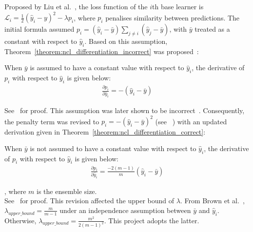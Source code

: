 Proposed by Liu et al.\ \cite{liu1999ensemble}, the loss function of the $i$th base learner is $\mathcal{L}_i = \frac{1}{2} (\hat{y}_i - y)^2 - \lambda p_i$, where $p_i$ penalises similarity between predictions. The initial formula assumed $p_i = (\hat{y}_i - \bar{y}) \sum_{j \neq i} (\hat{y}_j - \bar{y})$, with $\bar{y}$ treated as a constant with respect to $\hat{y}_i$. Based on this assumption, Theorem~\ref{theorem:ncl_differentiation_incorrect} was proposed~\cite{liu1999ensemble}: 
\begin{theorem}\label{theorem:ncl_differentiation_incorrect}
    When $\bar{y}$ is assumed to have a constant value with respect to $\hat{y}_i$, the derivative of $p_i$ with respect to $\hat{y}_i$ is given below: 
    \begin{align*}
        \frac{\partial{p_i}}{\partial{\hat{y}_i}} = -(\hat{y}_i - \bar{y})
    \end{align*}
\end{theorem}
See~\cite{liu1999ensemble} for proof. This assumption was later shown to be incorrect~\cite{brown2005managing}. Consequently, the penalty term was revised to $p_i = -(\hat{y}_i - \bar{y})^2$ (see ~\cite{brown2003negative}) with an updated derivation given in Theorem~\ref{theorem:ncl_differentiation_correct}: 
\begin{theorem}\label{theorem:ncl_differentiation_correct}
    When $\bar{y}$ is not assumed to have a constant value with respect to $\hat{y}_i$, the derivative of $p_i$ with respect to $\hat{y}_i$ is given below: 
    \begin{align*}
        \frac{\partial{p_i}}{\partial{\hat{y}_i}} = \frac{-2 (m - 1)}{m} (\hat{y}_i - \bar{y})
    \end{align*}
\end{theorem}
, where $m$ is the ensemble size. 
\\
See~\cite{brown2005managing} for proof. This revision affected the upper bound of $\lambda$. From Brown et al.\ \cite{brown2005managing}, $\lambda_{upper\_bound} = \frac{m}{m - 1}$ under an independence assumption between $\bar{y}$ and $\hat{y}_i$. Otherwise, $\lambda_{upper\_bound} = \frac{m^2}{2(m - 1)^2}$. This project adopts the latter. 


